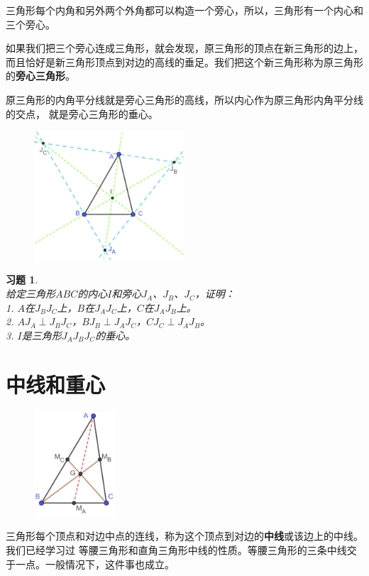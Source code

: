 \documentclass[12pt,UTF8]{ctexbook}
\newtheorem{xt}{习题}[section]
\begin{document}
三角形每个内角和另外两个外角都可以构造一个旁心，所以，三角形有一个内心和三个旁心。

如果我们把三个旁心连成三角形，就会发现，原三角形的顶点在新三角形的边上，
而且恰好是新三角形顶点到对边的高线的垂足。我们把这个新三角形称为原三角形的\textbf{旁心三角形}。

原三角形的内角平分线就是旁心三角形的高线，所以内心作为原三角形内角平分线的交点，
就是旁心三角形的垂心。

\begin{figure}[h] %
    \centering
    \vspace{10pt}
    \includegraphics[width=0.5\textwidth]{三角形内心旁心.png}
\end{figure}

\begin{xt}\label{xt:1-2-0}
    \mbox{}\\
    给定三角形$ABC$的内心$I$和旁心$J_A$、$J_B$、$J_C$，证明：\\
    1. $A$在$J_BJ_C$上，$B$在$J_AJ_C$上，$C$在$J_AJ_B$上。\\
    2. $AJ_A \perp J_BJ_C$，$BJ_B \perp J_AJ_C$，$CJ_C \perp J_AJ_B$。\\
    3. $I$是三角形$J_AJ_BJ_C$的垂心。
\end{xt}

\section{中线和重心}
\begin{figure} %
    \vspace{-60pt}
    \includegraphics[width=0.27\textwidth]{三角形重心证明.png}
\end{figure}
三角形每个顶点和对边中点的连线，称为这个顶点到对边的\textbf{中线}或该边上的中线。我们已经学习过
等腰三角形和直角三角形中线的性质。等腰三角形的三条中线交于一点。一般情况下，这件事也成立。
\end{document}

